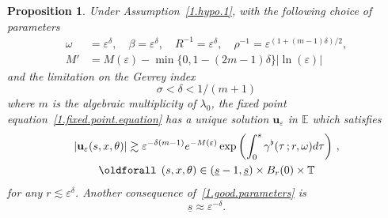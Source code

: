 \documentclass[10pt]{amsart}
\newtheorem{prop}[cdrthm]{Proposition}
\theoremstyle{definition}
\theoremstyle{plain}
\newcommand*\e{\varepsilon}
\newcommand*\EE{{\mathbb E}}
\newcommand*\g{\gamma}
\newcommand{\ubf}{{\mathbf u}}
\newcommand*\und{\underline}
\renewcommand*{\forall}{\mathrel{\oldforall}}
\begin{document}
\begin{prop}\label{1.prop.below}
Under Assumption~\ref{1.hypo.1}, with the following choice of parameters
\begin{equation}\label{1.good.parameters}
\begin{aligned}
\omega &= \e^{\delta}, \quad \beta = \e^{\delta}, \quad R^{-1} = \e^{\delta}, \quad \rho^{-1} = \e^{(1 + (m-1)\delta)/2},\\
M' &= M(\e) - \min\{ 0, 1 - (2m-1)\delta \}|\ln(\e)|
\end{aligned}
\end{equation}
and the limitation on the Gevrey index
\[
\sigma < \delta <1/(m+1)
\]
where $m$ is the algebraic multiplicity of $\lambda_0$, the fixed point equation~\eqref{1.fixed.point.equation} has a unique solution $\ubf_{\e}$ in $\EE$ which satisfies
\begin{multline}
|\ubf_{\e}(s,x,\theta)| \gtrsim \e^{-\delta(m-1)} e^{-M(\e)} \exp \left(\int_{0}^{s} \g^{\flat}(\tau\,; r, \omega) d\tau \right) \,,\\
\forall\,(s,x,\theta)\in(\und{s} - 1, \und{s}) \times B_r(0)\times\mathbb{T}
\end{multline}
for any $r \lesssim \e^{\delta}$. Another consequence of~\eqref{1.good.parameters} is
\begin{equation}\label{1.final.und.s}
\und{s} \approx \e^{-\delta}.
\end{equation}
\end{prop}
\end{document}
